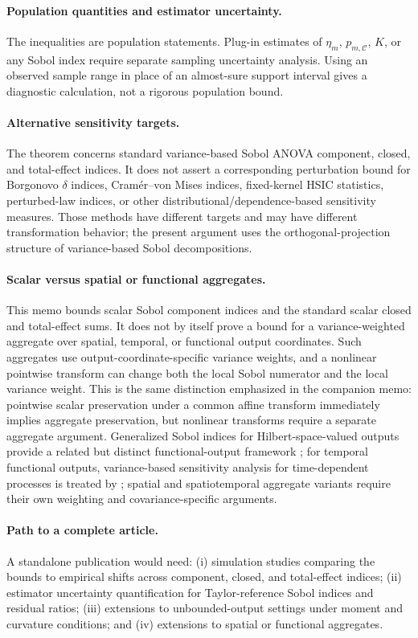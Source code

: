 \documentclass[11pt,letterpaper]{article}
\theoremstyle{remark}
\begin{document}
\paragraph{Population quantities and estimator uncertainty.}
The inequalities are population statements. Plug-in estimates of
$\eta_m$, $p_{m,\mathscr C}$, $K$, or any Sobol index require separate sampling
uncertainty analysis. Using an observed sample range in place of an almost-sure
support interval gives a diagnostic calculation, not a rigorous population
bound.

\paragraph{Alternative sensitivity targets.}
The theorem concerns standard variance-based Sobol ANOVA component, closed, and
total-effect indices. It does not assert a corresponding perturbation bound for
Borgonovo $\delta$ indices, Cram\'{e}r--von Mises indices, fixed-kernel HSIC
statistics, perturbed-law indices, or other distributional/dependence-based
sensitivity measures. Those methods have different targets and may have
different transformation behavior; the present argument uses the
orthogonal-projection structure of variance-based Sobol decompositions.

\paragraph{Scalar versus spatial or functional aggregates.}
This memo bounds scalar Sobol component indices and the standard scalar closed
and total-effect sums. It does not by itself prove a bound for a
variance-weighted aggregate over spatial, temporal, or functional output
coordinates. Such aggregates use output-coordinate-specific variance weights,
and a nonlinear pointwise transform can change both the local Sobol numerator and
the local variance weight. This is the same distinction emphasized in the
companion memo: pointwise scalar preservation under a common affine transform
immediately implies aggregate preservation, but nonlinear transforms require a
separate aggregate argument. Generalized Sobol indices for Hilbert-space-valued
outputs provide a related but distinct functional-output framework
\citep{Gamboa2014}; for temporal functional outputs, variance-based sensitivity
analysis for time-dependent processes is treated by
\citet{AlexanderianGremaudSmith2020}; spatial and spatiotemporal aggregate
variants require their own weighting and covariance-specific arguments.

\paragraph{Path to a complete article.}
A standalone publication would need: (i) simulation studies comparing the bounds
to empirical shifts across component, closed, and total-effect indices;
(ii) estimator uncertainty quantification for Taylor-reference Sobol indices and
residual ratios; (iii) extensions to unbounded-output settings under moment and
curvature conditions; and (iv) extensions to spatial or functional aggregates.



\end{document}
